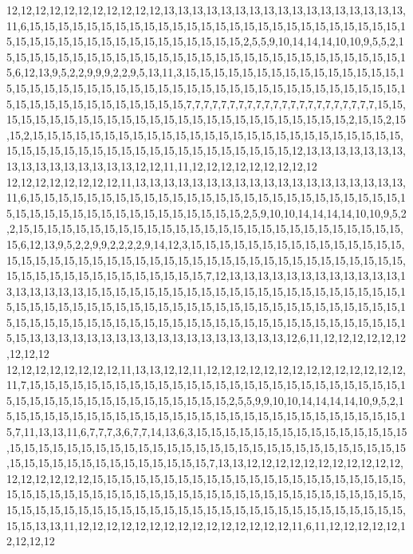 12,12,12,12,12,12,12,12,12,12,12,13,13,13,13,13,13,13,13,13,13,13,13,13,13,13,13,13,11,6,15,15,15,15,15,15,15,15,15,15,15,15,15,15,15,15,15,15,15,15,15,15,15,15,15,15,15,15,15,15,15,15,15,15,15,15,15,15,15,15,15,15,15,2,5,5,9,10,14,14,14,10,10,9,5,5,2,15,15,15,15,15,15,15,15,15,15,15,15,15,15,15,15,15,15,15,15,15,15,15,15,15,15,15,15,15,6,12,13,9,5,2,2,9,9,9,2,2,9,5,13,11,3,15,15,15,15,15,15,15,15,15,15,15,15,15,15,15,15,15,15,15,15,15,15,15,15,15,15,15,15,15,15,15,15,15,15,15,15,15,15,15,15,15,15,15,15,15,15,15,15,15,15,15,15,15,15,15,15,7,7,7,7,7,7,7,7,7,7,7,7,7,7,7,7,7,7,7,7,7,7,15,15,15,15,15,15,15,15,15,15,15,15,15,15,15,15,15,15,15,15,15,15,15,15,15,15,2,15,15,2,15,15,2,15,15,15,15,15,15,15,15,15,15,15,15,15,15,15,15,15,15,15,15,15,15,15,15,15,15,15,15,15,15,15,15,15,15,15,15,15,15,15,15,15,15,15,15,15,15,12,13,13,13,13,13,13,13,13,13,13,13,13,13,13,13,13,12,12,11,11,12,12,12,12,12,12,12,12,12
12,12,12,12,12,12,12,12,11,13,13,13,13,13,13,13,13,13,13,13,13,13,13,13,13,13,13,13,11,6,15,15,15,15,15,15,15,15,15,15,15,15,15,15,15,15,15,15,15,15,15,15,15,15,15,15,15,15,15,15,15,15,15,15,15,15,15,15,15,15,15,15,15,2,5,9,10,10,14,14,14,14,10,10,9,5,2,2,15,15,15,15,15,15,15,15,15,15,15,15,15,15,15,15,15,15,15,15,15,15,15,15,15,15,15,15,6,12,13,9,5,2,2,9,9,2,2,2,2,9,14,12,3,15,15,15,15,15,15,15,15,15,15,15,15,15,15,15,15,15,15,15,15,15,15,15,15,15,15,15,15,15,15,15,15,15,15,15,15,15,15,15,15,15,15,15,15,15,15,15,15,15,15,15,15,15,15,15,15,15,7,12,13,13,13,13,13,13,13,13,13,13,13,13,13,13,13,13,13,13,15,15,15,15,15,15,15,15,15,15,15,15,15,15,15,15,15,15,15,15,15,15,15,15,15,15,15,15,15,15,15,15,15,15,15,15,15,15,15,15,15,15,15,15,15,15,15,15,15,15,15,15,15,15,15,15,15,15,15,15,15,15,15,15,15,15,15,15,15,15,15,15,15,15,15,15,15,15,15,15,13,13,13,13,13,13,13,13,13,13,13,13,13,13,13,13,13,13,12,6,11,12,12,12,12,12,12,12,12,12
12,12,12,12,12,12,12,12,11,13,13,12,12,11,12,12,12,12,12,12,12,12,12,12,12,12,12,12,11,7,15,15,15,15,15,15,15,15,15,15,15,15,15,15,15,15,15,15,15,15,15,15,15,15,15,15,15,15,15,15,15,15,15,15,15,15,15,15,15,15,15,15,2,5,5,9,9,10,10,14,14,14,14,10,9,5,2,15,15,15,15,15,15,15,15,15,15,15,15,15,15,15,15,15,15,15,15,15,15,15,15,15,15,15,15,15,7,11,13,13,11,6,7,7,7,3,6,7,7,14,13,6,3,15,15,15,15,15,15,15,15,15,15,15,15,15,15,15,15,15,15,15,15,15,15,15,15,15,15,15,15,15,15,15,15,15,15,15,15,15,15,15,15,15,15,15,15,15,15,15,15,15,15,15,15,15,15,15,15,15,7,13,13,12,12,12,12,12,12,12,12,12,12,12,12,12,12,12,12,12,15,15,15,15,15,15,15,15,15,15,15,15,15,15,15,15,15,15,15,15,15,15,15,15,15,15,15,15,15,15,15,15,15,15,15,15,15,15,15,15,15,15,15,15,15,15,15,15,15,15,15,15,15,15,15,15,15,15,15,15,15,15,15,15,15,15,15,15,15,15,15,15,15,15,15,15,15,15,15,15,13,13,11,12,12,12,12,12,12,12,12,12,12,12,12,12,12,12,11,6,11,12,12,12,12,12,12,12,12,12
